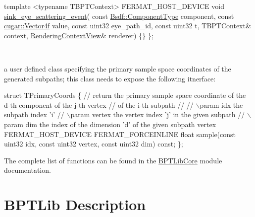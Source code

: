 \begin{DoxyParagraph}{}
\begin{DoxyEnumerate}
\begin{DoxyCodeInclude}
    \textcolor{keyword}{template} <\textcolor{keyword}{typename} TBPTContext>
    FERMAT\_HOST\_DEVICE
    \textcolor{keywordtype}{void} \hyperlink{struct_sample_sink_base_ac96fd485e8196264c43115c68a0bbc25}{sink\_eye\_scattering\_event}(
        \textcolor{keyword}{const} \hyperlink{struct_bsdf_a5f7db6f81220ed9ee6da109d6eb5b585}{Bsdf::ComponentType}    component,
        \textcolor{keyword}{const} \hyperlink{structcugar_1_1_vector}{cugar::Vector4f}        value,
        \textcolor{keyword}{const} uint32                eye\_path\_id,
        \textcolor{keyword}{const} uint32                t,
        TBPTContext&                context,
        \hyperlink{struct_rendering_context_view}{RenderingContextView}&       renderer)
    \{\}
\};
\end{DoxyCodeInclude}
~\newline
\label{_b_p_t_lib_page_TPrimaryCoordinates}%
%

\item a user defined class specifying the primary sample space coordinates of the generated subpaths; this class needs to expose the following itnerface\+: ~\newline

\begin{DoxyCode}
\textcolor{keyword}{struct }TPrimaryCoords
\{
   \textcolor{comment}{// return the primary sample space coordinate of the d-th component of the j-th vertex}
   \textcolor{comment}{// of the i-th subpath}
   \textcolor{comment}{//}
   \textcolor{comment}{// \(\backslash\)param idx       the subpath index 'i'}
   \textcolor{comment}{// \(\backslash\)param vertex    the vertex index 'j' in the given subpath}
   \textcolor{comment}{// \(\backslash\)param dim       the index of the dimension 'd' of the given subpath vertex}
   FERMAT\_HOST\_DEVICE FERMAT\_FORCEINLINE
   \textcolor{keywordtype}{float} sample(\textcolor{keyword}{const} uint32 idx, \textcolor{keyword}{const} uint32 vertex, \textcolor{keyword}{const} uint32 dim) \textcolor{keyword}{const};
\};
\end{DoxyCode}
 
\end{DoxyEnumerate}
\end{DoxyParagraph}
\begin{DoxyParagraph}{}
The complete list of functions can be found in the \hyperlink{group___b_p_t_lib_core}{B\+P\+T\+Lib\+Core} module documentation.
\end{DoxyParagraph}
\hypertarget{_b_p_t_lib_page_BPTLibSection}{}\section{B\+P\+T\+Lib Description}\label{_b_p_t_lib_page_BPTLibSection}
